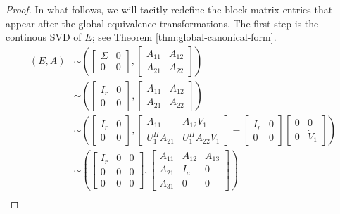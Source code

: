 \documentclass[]{book}
\theoremstyle{definition}
\theoremstyle{definition}
\theoremstyle{definition}
\theoremstyle{definition}
\theoremstyle{remark}
\begin{document}
\begin{proof}
{}In what follows, we will tacitly redefine the block matrix entries that appear after the global equivalence transformations. The first step is the continous SVD of \(E\); see Theorem \ref{thm:global-canonical-form}.
\begin{align*}
(E,A) & 
\sim   
\left(\begin{bmatrix}
\Sigma & 0 \\
0 & 0
\end{bmatrix},
\begin{bmatrix}
A_{11} & A_{12} \\
A_{21} & A_{22}
\end{bmatrix}\right) \\
& \sim   
\left(\begin{bmatrix}
I_r & 0 \\
0 & 0
\end{bmatrix},
\begin{bmatrix}
A_{11} & A_{12} \\
A_{21} & A_{22}
\end{bmatrix}\right) \\
& \sim   
\left(\begin{bmatrix}
I_r & 0 \\
0 & 0
\end{bmatrix},
\begin{bmatrix}
A_{11} & A_{12}V_1 \\
U_1^HA_{21} & U_1^HA_{22}V_1 
\end{bmatrix}
-
\begin{bmatrix} I_r & 0 \\ 0 & 0 \end{bmatrix}
\begin{bmatrix} 0 & 0 \\ 0 & \dot V_1 \end{bmatrix}
\right) \\
& \sim   
\left(\begin{bmatrix}
I_r & 0 & 0 \\
0 & 0 & 0 \\
0 & 0 & 0
\end{bmatrix},
\begin{bmatrix}
A_{11} & A_{12} & A_{13}\\
A_{21} & I_a & 0 \\
A_{31} & 0  & 0
\end{bmatrix}\right) \\

\end{align*}
\end{proof}
\end{document}
